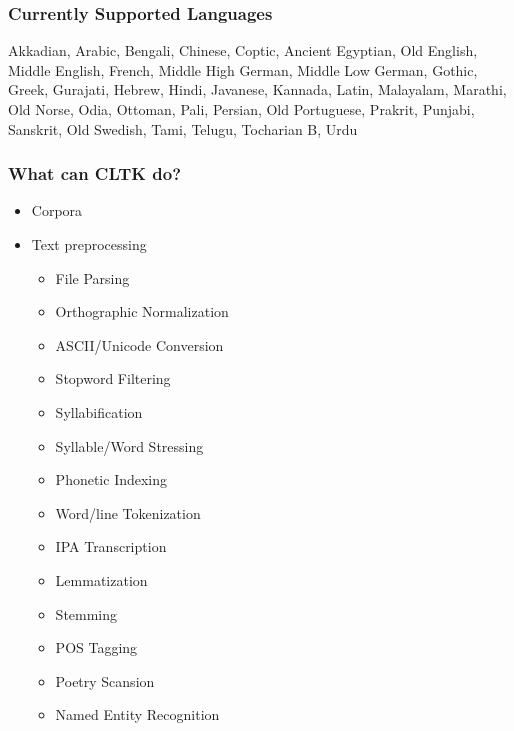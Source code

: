 \documentclass{beamer}
\begin{document}
\begin{frame}
\frametitle{Currently Supported Languages}
Akkadian, Arabic, Bengali, Chinese, Coptic, Ancient Egyptian, Old English, Middle English, French,
Middle High German, Middle Low German, Gothic, Greek, Gurajati, Hebrew, Hindi, Javanese,
Kannada, Latin, Malayalam, Marathi, Old Norse, Odia, Ottoman, Pali, Persian, Old Portuguese,
Prakrit, Punjabi, Sanskrit, Old Swedish, Tami, Telugu, Tocharian B, Urdu
\end{frame}



\begin{frame}
\frametitle{What can CLTK do?}
\begin{itemize}
    \item Corpora
    \item Text preprocessing
    \begin{itemize}
        \item File Parsing
        \item Orthographic Normalization
        \item ASCII/Unicode Conversion
        \item Stopword Filtering
        \item Syllabification
        \item Syllable/Word Stressing
        \item Phonetic Indexing
        \item Word/line Tokenization
        \item IPA Transcription
        \item Lemmatization
        \item Stemming
        \item POS Tagging
        \item Poetry Scansion
        \item Named Entity Recognition
    \end{itemize}
    
\end{itemize}
\end{frame}
\end{document}
